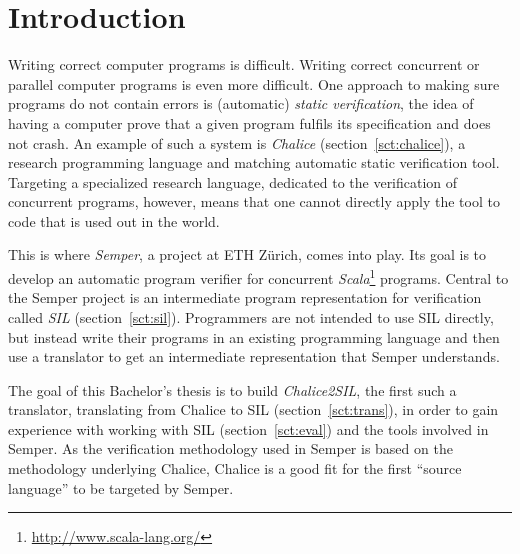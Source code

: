 
\section{Introduction}
Writing correct computer programs is difficult. 
Writing correct concurrent or parallel computer programs is even more difficult. 
One approach to making sure programs do not contain errors is (automatic) \emph{static verification}, the idea of having a computer prove that a given program fulfils its specification and does not crash.
An example of such a system is \emph{Chalice} \cite{LMS09} (section~\ref{sct:chalice}), a research programming language and matching automatic static verification tool.
Targeting a specialized research language, dedicated to the verification of concurrent programs, however, means that one cannot directly apply the tool to code that is used out in the world.

This is where \emph{Semper}, a project at ETH Zürich, comes into play. 
Its goal is to develop an automatic program verifier for concurrent \emph{Scala}\footnote{\url{http://www.scala-lang.org/}} programs.
Central to the Semper project is an intermediate program representation for verification called \emph{SIL} (section~\ref{sct:sil}).
Programmers are not intended to use SIL directly, but instead write their programs in an existing programming  language and then use a translator to get an intermediate representation that Semper understands.

The goal of this Bachelor's thesis is to build \emph{Chalice2SIL}, the first such a translator, translating from Chalice to SIL (section~\ref{sct:trans}), in order to gain experience with working with SIL (section~\ref{sct:eval}) and the tools involved in Semper.
As the verification methodology used in Semper is based on the methodology underlying Chalice, Chalice is a good fit for the first ``source language'' to be targeted by Semper.